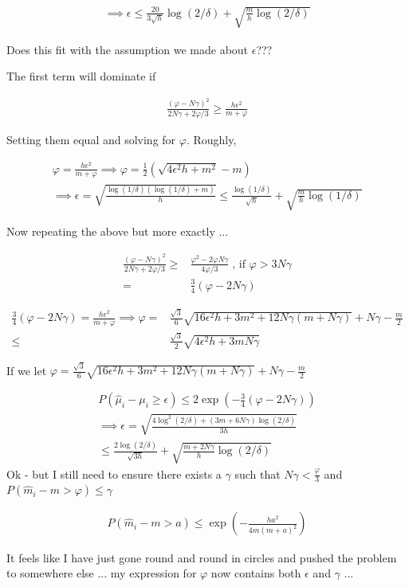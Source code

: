 \documentclass{article}
\newcommand{\eqn}[1]{\begin{align}#1\end{align}}
\theoremstyle{plain}
\theoremstyle{definition}
\begin{document}
\eqn{
\implies \epsilon \leq \frac{20}{3\sqrt{h}}\log(2/\delta)+ \sqrt{\frac{m}{h}\log(2/\delta)} 
}

Does this fit with the assumption we made about $\epsilon$???

\pagebreak





The first term will dominate if 

\eqn{
\frac{(\varphi-N\gamma)^2}{2N\gamma + 2\varphi/3} \geq \frac{h\epsilon^2}{m+\varphi}
}


Setting them equal and solving for $\varphi$. Roughly,

\eqn{
\varphi = \frac{h\epsilon^2}{m+\varphi} \implies \varphi = \frac{1}{2}(\sqrt{4\epsilon^2 h+ m^2} - m)\\
\implies \epsilon = \sqrt{\frac{\log(1/\delta)(\log(1/\delta)+m)}{h}} \leq \frac{\log(1/\delta)}{\sqrt{h}} + \sqrt{\frac{m}{h}\log(1/\delta)}
}

Now repeating the above but more exactly ...

\eqn{
\frac{(\varphi-N\gamma)^2}{2N\gamma + 2\varphi/3}  \geq & \frac{\varphi^2-2\varphi N\gamma}{4\varphi/3} \; \text{, if } \varphi > 3N\gamma \\
= & \frac{3}{4}(\varphi - 2N\gamma)
}

\eqn{
\frac{3}{4}(\varphi - 2N\gamma) = \frac{h\epsilon^2}{m+\varphi} \implies \varphi = &\frac{\sqrt{3}}{6}\sqrt{16\epsilon^2 h+3m^2+12N\gamma(m+N\gamma)} + N\gamma - \frac{m}{2}\\
\leq & \frac{\sqrt{3}}{2}\sqrt{4\epsilon^2 h+3mN\gamma}
}

If we let $\varphi =\frac{\sqrt{3}}{6}\sqrt{16\epsilon^2 h+3m^2+12N\gamma(m+N\gamma)} + N\gamma - \frac{m}{2} $

\eqn{
P(\hat{\mu}_i-\mu_i \geq \epsilon) \leq 2\exp(-\frac{3}{4}(\varphi - 2N\gamma))\\
\implies \epsilon = \sqrt{\frac{4\log^2(2/\delta)+(3m+6N\gamma)\log(2/\delta)}{3h}}\\
\leq \frac{2\log(2/\delta)}{\sqrt{3h}}+\sqrt{\frac{m+2N\gamma}{h}\log(2/\delta)}
}
Ok - but I still need to ensure there exists a $\gamma$ such that  $N\gamma < \frac{\varphi}{3}$ and $P(\hat{m}_i - m > \varphi) \leq \gamma$

\eqn{
P(\hat{m}_i - m > a) \leq \exp(-\frac{h a^2}{4m(m+a)^2})
}


It feels like I have just gone round and round in circles and pushed the problem to somewhere else ... my expression for $\varphi$ now contains both $\epsilon$ and $\gamma$ ...
\end{document}
